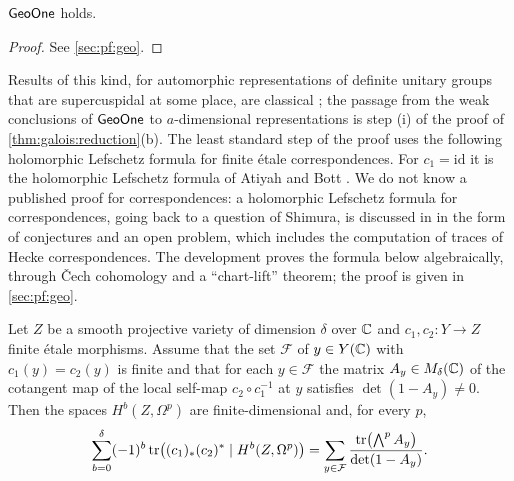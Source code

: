 \begin{theorem}\Fmark\label{thm:geoone}
$\mathsf{GeoOne}$ holds. 
\end{theorem}
\begin{proof}See \cref{sec:pf:geo}.
\end{proof}


Results of this kind, for automorphic representations of definite unitary groups that are
supercuspidal at some place, are classical \cite{Kottwitz1990,Kottwitz1992,Clozel1991,HarrisTaylor2001};
the passage from the weak conclusions of $\mathsf{GeoOne}$ to $a$-dimensional representations is step
(i) of the proof of \cref{thm:galois:reduction}(b). The least standard step of the proof uses the
following holomorphic Lefschetz formula for finite \'etale correspondences. For $c_1=\mathrm{id}$ it is the
holomorphic Lefschetz formula of Atiyah and Bott \cite{AtiyahBott1968,ToledoTong1978}. We do not know a published
proof for correspondences: a holomorphic Lefschetz formula for correspondences, going back to a question of
Shimura, is discussed in \cite{Tu2023} in the form of conjectures and an open problem, which includes the
computation of traces of Hecke correspondences. The development proves the formula below algebraically,
through \v{C}ech cohomology and a ``chart-lift'' theorem; the proof is given in \cref{sec:pf:geo}.

\begin{theorem}\Fmark\label{thm:galois:hlf}
Let $Z$ be a smooth projective variety of dimension $\delta$ over $\mathbb{C}$ and $c_1,c_2\colon Y\to Z$ finite
\'etale morphisms. Assume that the set $\mathcal F$ of $y\in Y(\mathbb{C})$ with $c_1(y)=c_2(y)$ is finite and
that for each $y\in\mathcal F$ the matrix $A_y\in M_\delta(\mathbb{C})$ of the cotangent map of the local
self-map $c_2\circ c_1^{-1}$ at $y$ satisfies $\det(1-A_y)\ne0$. Then the spaces $H^b(Z,\Omega^p)$ are
finite-dimensional and, for every $p$,
\[
  \sum_{b=0}^{\delta}(-1)^b\operatorname{tr}\bigl((c_1)_*(c_2)^*\mid H^b(Z,\Omega^p)\bigr)
  =\sum_{y\in\mathcal F}\frac{\operatorname{tr}\bigl(\bigwedge^pA_y\bigr)}{\det(1-A_y)}.
\]
\end{theorem}

